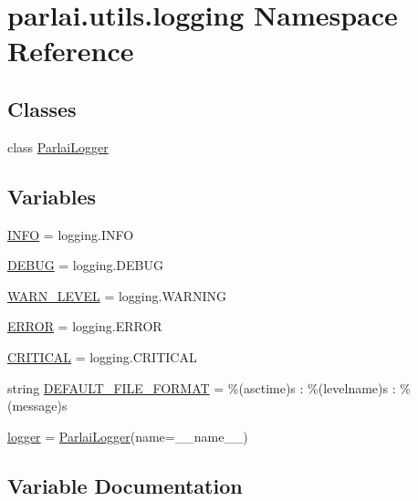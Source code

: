 \hypertarget{namespaceparlai_1_1utils_1_1logging}{}\section{parlai.\+utils.\+logging Namespace Reference}
\label{namespaceparlai_1_1utils_1_1logging}
\subsection*{Classes}
\begin{DoxyCompactItemize}
\item 
class \hyperlink{classparlai_1_1utils_1_1logging_1_1ParlaiLogger}{Parlai\+Logger}
\end{DoxyCompactItemize}
\subsection*{Variables}
\begin{DoxyCompactItemize}
\item 
\hyperlink{namespaceparlai_1_1utils_1_1logging_a4bc2de74317465e5d1a8b5d7b913d48a}{I\+N\+FO} = logging.\+I\+N\+FO
\item 
\hyperlink{namespaceparlai_1_1utils_1_1logging_ab324194e88a7aab20579ec176d8e47ed}{D\+E\+B\+UG} = logging.\+D\+E\+B\+UG
\item 
\hyperlink{namespaceparlai_1_1utils_1_1logging_afec7af7cd10ea4f525100666308d8bec}{W\+A\+R\+N\+\_\+\+L\+E\+V\+EL} = logging.\+W\+A\+R\+N\+I\+NG
\item 
\hyperlink{namespaceparlai_1_1utils_1_1logging_a5b52734ed566f29c71aed8c182ae635c}{E\+R\+R\+OR} = logging.\+E\+R\+R\+OR
\item 
\hyperlink{namespaceparlai_1_1utils_1_1logging_a62c2f00eeb086c49df5c01f9ed2f7063}{C\+R\+I\+T\+I\+C\+AL} = logging.\+C\+R\+I\+T\+I\+C\+AL
\item 
string \hyperlink{namespaceparlai_1_1utils_1_1logging_a902b15be98c1257348b242bfc367842b}{D\+E\+F\+A\+U\+L\+T\+\_\+\+F\+I\+L\+E\+\_\+\+F\+O\+R\+M\+AT} = \textquotesingle{}\%(asctime)s \+: \%(levelname)s \+: \%(message)s\textquotesingle{}
\item 
\hyperlink{namespaceparlai_1_1utils_1_1logging_ab73f941d285f8581d5e81540f5600a98}{logger} = \hyperlink{classparlai_1_1utils_1_1logging_1_1ParlaiLogger}{Parlai\+Logger}(name=\+\_\+\+\_\+name\+\_\+\+\_\+)
\end{DoxyCompactItemize}


\subsection{Variable Documentation}
\mbox{\label{namespaceparlai_1_1utils_1_1logging_a62c2f00eeb086c49df5c01f9ed2f7063}} 
